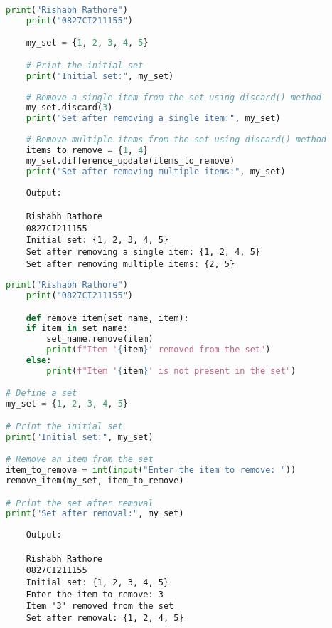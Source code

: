 \documentclass{report}
\begin{document}
\sol 
\begin{lstlisting}[language=Python]
	print("Rishabh Rathore")
	print("0827CI211155")

	my_set = {1, 2, 3, 4, 5}

	# Print the initial set
	print("Initial set:", my_set)
	
	# Remove a single item from the set using discard() method
	my_set.discard(3)
	print("Set after removing a single item:", my_set)
	
	# Remove multiple items from the set using discard() method
	items_to_remove = {1, 4}
	my_set.difference_update(items_to_remove)
	print("Set after removing multiple items:", my_set)
\end{lstlisting}

\begin{verbatim}
	Output:

	Rishabh Rathore
	0827CI211155
	Initial set: {1, 2, 3, 4, 5}
	Set after removing a single item: {1, 2, 4, 5}
	Set after removing multiple items: {2, 5}

\end{verbatim}

\newpage


\sol 
\begin{lstlisting}[language=Python]
	print("Rishabh Rathore")
	print("0827CI211155")

	def remove_item(set_name, item):
    if item in set_name:
        set_name.remove(item)
        print(f"Item '{item}' removed from the set")
    else:
        print(f"Item '{item}' is not present in the set")

# Define a set
my_set = {1, 2, 3, 4, 5}

# Print the initial set
print("Initial set:", my_set)

# Remove an item from the set
item_to_remove = int(input("Enter the item to remove: "))
remove_item(my_set, item_to_remove)

# Print the set after removal
print("Set after removal:", my_set)
\end{lstlisting}

\begin{verbatim}
	Output:

	Rishabh Rathore
	0827CI211155
	Initial set: {1, 2, 3, 4, 5}
	Enter the item to remove: 3
	Item '3' removed from the set
	Set after removal: {1, 2, 4, 5}
	
	

\end{verbatim}
\end{document}
